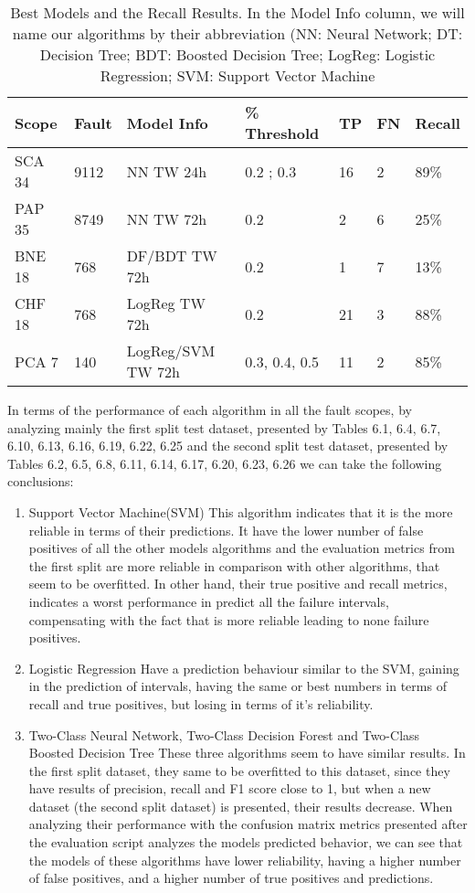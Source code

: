 \begin{table}[!ht]
    \centering
    \begin{tabular}{|l|l|l|l|l|l|l|}
    \hline
        Scope & Fault & Model Info & \% Threshold & TP & FN & Recall \\ \hline
        SCA 34 & 9112 & NN TW 24h & 0.2 ; 0.3 & 16 & 2 & 89\% \\ \hline
        PAP 35 & 8749 & NN TW 72h & 0.2 & 2 & 6 & 25\% \\ \hline
        BNE 18 & 768 & DF/BDT TW 72h & 0.2 & 1 & 7 & 13\% \\ \hline
        CHF 18 & 768 & LogReg TW 72h & 0.2 & 21 & 3 & 88\% \\ \hline
        PCA 7 & 140 & LogReg/SVM TW 72h & 0.3, 0.4, 0.5 & 11 & 2 & 85\% \\ \hline
    \end{tabular}
    \caption{Best Models and the Recall Results. In the Model Info column, we will name our algorithms by their abbreviation (NN: Neural Network; DT: Decision Tree; BDT: Boosted Decision Tree; LogReg: Logistic Regression; SVM: Support Vector Machine}
\end{table}

In terms of the performance of each algorithm in all the fault scopes, by analyzing mainly the first split test dataset, presented by Tables 6.1, 6.4, 6.7, 6.10, 6.13, 6.16, 6.19, 6.22, 6.25 and the second split test dataset, presented by Tables 6.2, 6.5, 6.8, 6.11, 6.14, 6.17, 6.20, 6.23, 6.26 we can take the following conclusions:
\begin{enumerate}
    \item{Support Vector Machine(SVM)}
This algorithm indicates that it is the more reliable in terms of their predictions. It have the lower number of false positives of all the other models algorithms and the evaluation metrics from the first split are more reliable in comparison with other algorithms, that seem to be overfitted.
In other hand, their true positive and recall metrics, indicates a worst performance in predict all the failure intervals, compensating with the fact that is more reliable leading to none failure positives.
    \item{Logistic Regression}
Have a prediction behaviour similar to the SVM, gaining in the prediction of intervals, having the same or best numbers in terms of recall and true positives, but losing in terms of it's reliability.
    \item{Two-Class Neural Network, Two-Class Decision Forest and Two-Class Boosted Decision Tree}
These three algorithms seem to have similar results. In the first split dataset, they same to be overfitted to this dataset, since they have results of precision, recall and F1 score close to 1, but when a new dataset (the second split dataset) is presented, their results decrease. When analyzing their performance with the confusion matrix metrics presented after the evaluation script analyzes the models predicted behavior, we can see that the models of these algorithms have lower reliability, having a higher number of false positives, and a higher number of true positives and predictions.
\end{enumerate}

